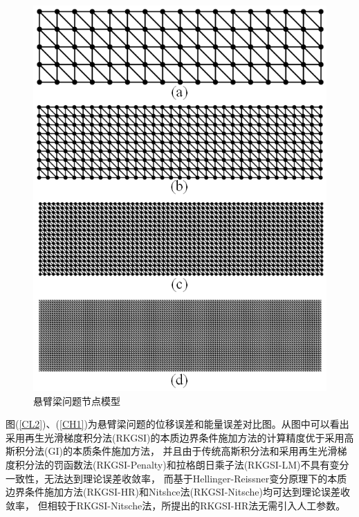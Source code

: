 \begin{figure}[!h]
    \centering
    \includegraphics{figure/cantilever.mesh.png}
    \caption{悬臂梁问题节点模型}\label{cantilever.mesh}
\end{figure}\newpage
图(\ref{CL2})、(\ref{CH1})为悬臂梁问题的位移误差和能量误差对比图。从图中可以看出采用再生光滑梯度积分法(RKGSI)的本质边界条件施加方法的计算精度优于采用高斯积分法(GI)的本质条件施加方法，
并且由于传统高斯积分法和采用再生光滑梯度积分法的罚函数法(RKGSI-Penalty)和拉格朗日乘子法(RKGSI-LM)不具有变分一致性，无法达到理论误差收敛率，
而基于Hellinger-Reissner变分原理下的本质边界条件施加方法(RKGSI-HR)和Nitshce法(RKGSI-Nitsche)均可达到理论误差收敛率，
但相较于RKGSI-Nitsche法，所提出的RKGSI-HR法无需引入人工参数。\par

